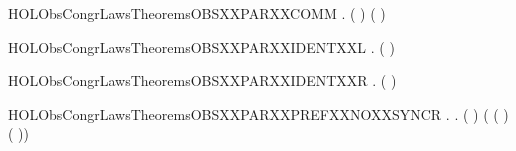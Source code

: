 \begin{SaveVerbatim}{HOLObsCongrLawsTheoremsOBSXXPARXXCOMM}
\HOLTokenTurnstile{} \HOLSymConst{\HOLTokenForall{}} .  ( \HOLSymConst{\ensuremath{\parallel}} ) ( \HOLSymConst{\ensuremath{\parallel}} )
\end{SaveVerbatim}
\newcommand{\HOLObsCongrLawsTheoremsOBSXXPARXXCOMM}{\UseVerbatim{HOLObsCongrLawsTheoremsOBSXXPARXXCOMM}}
\begin{SaveVerbatim}{HOLObsCongrLawsTheoremsOBSXXPARXXIDENTXXL}
\HOLTokenTurnstile{} \HOLSymConst{\HOLTokenForall{}}.  ( \HOLSymConst{\ensuremath{\parallel}} ) 
\end{SaveVerbatim}
\newcommand{\HOLObsCongrLawsTheoremsOBSXXPARXXIDENTXXL}{\UseVerbatim{HOLObsCongrLawsTheoremsOBSXXPARXXIDENTXXL}}
\begin{SaveVerbatim}{HOLObsCongrLawsTheoremsOBSXXPARXXIDENTXXR}
\HOLTokenTurnstile{} \HOLSymConst{\HOLTokenForall{}}.  ( \HOLSymConst{\ensuremath{\parallel}} ) 
\end{SaveVerbatim}
\newcommand{\HOLObsCongrLawsTheoremsOBSXXPARXXIDENTXXR}{\UseVerbatim{HOLObsCongrLawsTheoremsOBSXXPARXXIDENTXXR}}
\begin{SaveVerbatim}{HOLObsCongrLawsTheoremsOBSXXPARXXPREFXXNOXXSYNCR}
\HOLTokenTurnstile{} \HOLSymConst{\HOLTokenForall{}} .
        \HOLSymConst{\HOLTokenNotEqual{}}   \HOLSymConst{\HOLTokenImp{}}
       \HOLSymConst{\HOLTokenForall{}} .
            (  \HOLSymConst{\ensuremath{\parallel}}  )
             ( ( \HOLSymConst{\ensuremath{\parallel}}  ) \HOLSymConst{+}
               (  \HOLSymConst{\ensuremath{\parallel}} ))
\end{SaveVerbatim}
\newcommand{\HOLObsCongrLawsTheoremsOBSXXPARXXPREFXXNOXXSYNCR}{\UseVerbatim{HOLObsCongrLawsTheoremsOBSXXPARXXPREFXXNOXXSYNCR}}
